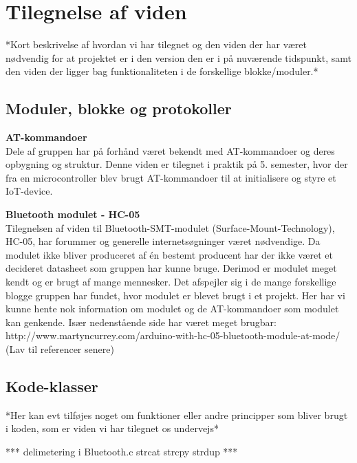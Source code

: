 \graphicspath{{Chapters/Alternative/}}


\section{Tilegnelse af viden}


*Kort beskrivelse af hvordan vi har tilegnet og den viden der har været nødvendig for at projektet er i den version den er i på nuværende tidspunkt, samt den viden der ligger bag funktionaliteten i de forskellige blokke/moduler.*

\subsection{Moduler, blokke og protokoller}
  
\textbf{AT-kommandoer} \\
Dele af gruppen har på forhånd været bekendt med AT-kommandoer og deres opbygning og struktur. Denne viden er tilegnet i praktik på 5. semester, hvor der fra en microcontroller blev brugt AT-kommandoer til at initialisere og styre et IoT-device.

\textbf{Bluetooth modulet - HC-05}\\
Tilegnelsen af viden til Bluetooth-SMT-modulet (Surface-Mount-Technology), HC-05, har forummer og generelle internetsøgninger været nødvendige. Da modulet ikke bliver produceret af én bestemt producent har der ikke været et decideret datasheet som gruppen har kunne bruge. Derimod er modulet meget kendt og er brugt af mange mennesker. Det afspejler sig i de mange forskellige blogge gruppen har fundet, hvor modulet er blevet brugt i et projekt. Her har vi kunne hente nok information om modulet og de AT-kommandoer som modulet kan genkende.
Især nedenstående side har været meget brugbar:
http://www.martyncurrey.com/arduino-with-hc-05-bluetooth-module-at-mode/
(Lav til referencer senere)

\subsection{Kode-klasser}
*Her kan evt tilføjes noget om funktioner eller andre principper som bliver brugt i koden, som er viden vi har tilegnet os undervejs*

*** delimetering i Bluetooth.c
strcat
strcpy
strdup ***